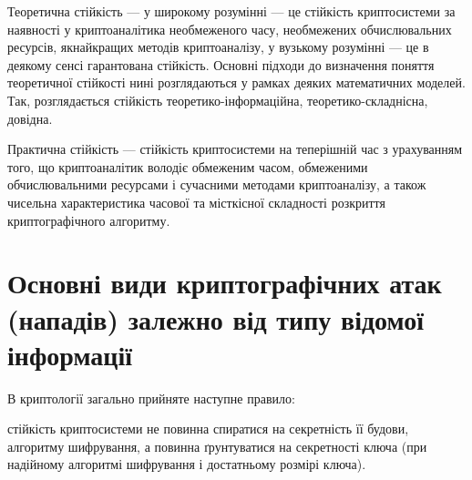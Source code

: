 \begin{definition}
    Теоретична стійкість ---  у широкому розумінні --- це стійкість
    криптосистеми за наявності у криптоаналітика необмеженого часу, необмежених
    обчислювальних ресурсів, якнайкращих методів криптоаналізу, у вузькому
    розумінні --- це в деякому сенсі гарантована стійкість. Основні підходи до
    визначення поняття теоретичної стійкості нині розглядаються у рамках деяких
    математичних моделей. Так, розглядається стійкість теоретико-інформаційна,
    теоретико-складнісна, довідна.
\end{definition}

\begin{definition}
    Практична стійкість --- стійкість криптосистеми на теперішній час з
    урахуванням того, що криптоаналітик володіє обмеженим часом,
    обмеженими обчислювальними ресурсами і сучасними методами криптоаналізу,  а
    також чисельна характеристика часової та місткісної складності розкриття
    криптографічного алгоритму.
\end{definition}

\section{Основні види криптографічних атак (нападів) залежно від типу відомої
    інформації}

В криптології загально прийняте наступне правило: 
\begin{definition}
    стійкість криптосистеми не повинна спиратися на секретність її будови,
    алгоритму шифрування, а повинна ґрунтуватися на секретності ключа (при
    надійному алгоритмі шифрування і достатньому розмірі ключа). 
\end{definition}

